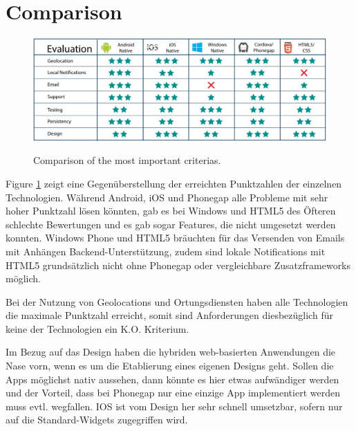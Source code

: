 \section{Comparison}

\begin{figure}[b!]
\caption{Comparison of the most important criterias.}
\centering
\includegraphics[scale=0.4]{resources/comparison.jpg}
\label{comparison}
\end{figure}

Figure \ref{comparison} zeigt eine Gegenüberstellung der erreichten Punktzahlen der einzelnen Technologien. Während Android, iOS und Phonegap alle Probleme mit sehr hoher Punktzahl lösen könnten, gab es bei Windows und HTML5 des Öfteren schlechte Bewertungen und es gab sogar Features, die nicht umgesetzt werden konnten. Windows Phone und HTML5 bräuchten für das Versenden von Emails mit Anhängen Backend-Unterstützung, zudem sind lokale Notifications mit HTML5 grundsätzlich nicht ohne Phonegap oder vergleichbare Zusatzframeworks möglich.

Bei der Nutzung von Geolocations und Ortungsdiensten haben alle Technologien die maximale Punktzahl erreicht, somit sind Anforderungen diesbezüglich für keine der Technologien ein K.O. Kriterium.

Im Bezug auf das Design haben die hybriden web-basierten Anwendungen die Nase vorn, wenn es um die Etablierung eines eigenen Designs geht. Sollen die Apps möglichst nativ aussehen, dann könnte es hier etwas aufwändiger werden und der Vorteil, dass bei Phonegap nur eine einzige App implementiert werden muss evtl. wegfallen. IOS ist vom Design her sehr schnell umsetzbar, sofern nur auf die Standard-Widgets zugegriffen wird. 

